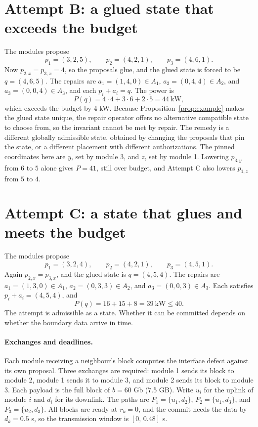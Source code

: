 \documentclass[11pt,openany]{book}
\theoremstyle{remark}
\begin{document}
\section{Attempt B: a glued state that exceeds the budget}

The modules propose
\[
p_1=(3,2,5),\qquad p_2=(4,2,1),\qquad p_3=(4,6,1).
\]
Now $p_{2,x}=p_{3,x}=4$, so the proposals glue, and the glued state is forced to be $q=(4,6,5)$. The repairs are $a_1=(1,4,0)\in A_1$, $a_2=(0,4,4)\in A_2$, and $a_3=(0,0,4)\in A_3$, and each $p_i+a_i=q$. The power is
\[
P(q)=4\cdot4+3\cdot6+2\cdot5=44\ \text{kW},
\]
which exceeds the budget by $4$ kW. Because Proposition~\ref{prop:example} makes the glued state unique, the repair operator offers no alternative compatible state to choose from, so the invariant cannot be met by repair. The remedy is a different globally admissible state, obtained by changing the proposals that pin the state, or a different placement with different authorizations. The pinned coordinates here are $y$, set by module 3, and $z$, set by module 1. Lowering $p_{3,y}$ from $6$ to $5$ alone gives $P=41$, still over budget, and Attempt C also lowers $p_{1,z}$ from $5$ to $4$.

\section{Attempt C: a state that glues and meets the budget}

The modules propose
\[
p_1=(3,2,4),\qquad p_2=(4,2,1),\qquad p_3=(4,5,1).
\]
Again $p_{2,x}=p_{3,x}$, and the glued state is $q=(4,5,4)$. The repairs are $a_1=(1,3,0)\in A_1$, $a_2=(0,3,3)\in A_2$, and $a_3=(0,0,3)\in A_3$. Each satisfies $p_i+a_i=(4,5,4)$, and
\[
P(q)=16+15+8=39\ \text{kW}\le40.
\]
The attempt is admissible as a state. Whether it can be committed depends on whether the boundary data arrive in time.

\paragraph{Exchanges and deadlines.} Each module receiving a neighbour's block computes the interface defect against its own proposal. Three exchanges are required: module 1 sends its block to module 2, module 1 sends it to module 3, and module 2 sends its block to module 3. Each payload is the full block of $b=60$ Gb (7.5 GB). Write $u_i$ for the uplink of module $i$ and $d_i$ for its downlink. The paths are $P_1=\{u_1,d_2\}$, $P_2=\{u_1,d_3\}$, and $P_3=\{u_2,d_3\}$. All blocks are ready at $r_k=0$, and the commit needs the data by $d_k=0.5$ s, so the transmission window is $[0,\,0.48]$ s.
\end{document}
